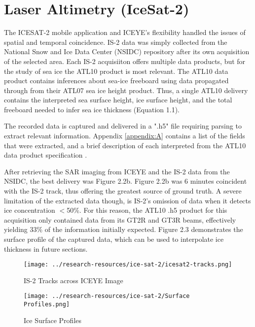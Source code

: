 \section {Laser Altimetry (IceSat-2)}
The ICESAT-2 mobile application and ICEYE's flexibility handled the issues of spatial and temporal coincidence. IS-2 data was simply collected from the National Snow and Ice Data Center (NSIDC) repository after its own acquisition of the selected area. Each IS-2 acquisiiton offers multiple data products, but for the study of sea ice the ATL10 product is most relevant. The ATL10 data product contains inferences about sea-ice freeboard using data propagated through from their ATL07 sea ice height product. Thus, a single ATL10 delivery contains the interpreted sea surface height, ice surface height, and the total freeboard \cite{ICESat-2-ATL10-Product} needed to infer sea ice thickness (Equation 1.1).

The recorded data is captured and delivered in a ".h5" file requiring parsing to extract relevant information. Appendix \ref{appendix:A} contains a list of the fields that were extracted, and a brief description of each interpreted from the ATL10 data product specification \cite*{ICESat-2-ATL10-Product}.

After retrieving the SAR imaging from ICEYE and the IS-2 data from the NSIDC, the best delivery was Figure 2.2b. Figure 2.2b was 6 minutes coincident with the IS-2 track, thus offering the greatest source of ground truth. A severe limitation of the extracted data though, is IS-2's omission of data when it detects ice concentration $<$50\%. For this reason, the ATL10 .h5 product for this acquisition only contained data from its GT2R and GT3R beams, effectively yielding 33\% of the information initially expected. Figure 2.3 demonstrates the surface profile of the captured data, which can be used to interpolate ice thickness in future sections.


\begin{figure}[h!]
	\centering
	\texttt{[image: ../research-resources/ice-sat-2/icesat2-tracks.png]}
	\caption[Overlayed LiDAR and SAR Readings]{IS-2 Tracks across ICEYE Image}
	\label{fig:icesat2-tracks}
\end{figure}

\begin{figure}[h!]
	\centering
	\texttt{[image: ../research-resources/ice-sat-2/Surface Profiles.png]}
	\caption[Ice Surface Profile of Acquired Data]{Ice Surface Profiles}
	\label{fig:ice-thickness-gathered}
\end{figure}

